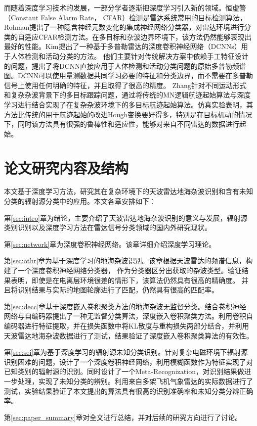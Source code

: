 而随着深度学习技术的发展，一部分学者逐渐把深度学习引入新的领域。恒虚警（Constant False Alarm Rate， CFAR）检测是雷达系统常用的目标检测算法，Rohman提出了一种隐含神经元数变化的集成神经网络分类器，对雷达环境进行分类的自适应CFAR检测方法。在多目标和杂波边界环境下，该方法仍然能够表现出最好的性能。Kim提出了一种基于多普勒雷达的深度卷积神经网络（DCNNs）用于人体检测和活动分类的方法。 他们主要针对传统解决方案中依赖手工特征设计的问题，提出了将DCNN直接应用于人体检测和活动分类问题的原始多普勒频谱图。DCNN可以使用量测数据共同学习必要的特征和分类边界，而不需要在多普勒信号上使用任何明确的特征，并且取得了很高的精度。
Zhang针对不同运动形式和复杂杂波背景下的多目标跟踪问题，通过将传统的MN逻辑航迹起始算法与深度学习进行结合实现了在复杂杂波环境下的多目标航迹起始算法。仿真实验表明，其方法比传统的用于航迹起始的改进Hough变换要好得多，特别是在目标机动的情况下，同时该方法具有很强的鲁棒性和适应性，能够对来自不同雷达的数据进行起始。


\section{论文研究内容及结构}

本文基于深度学习方法，研究其在复杂环境下的天波雷达地海杂波识别和含有未知分类的辐射源分类中的应用。本文各章安排如下：

第\ref{sec:intro}章为绪论，主要介绍了天波雷达地海杂波识别的意义与发展，辐射源类别识别以及深度学习方法在雷达信号分类领域的国内外研究现状。

第\ref{sec:network}章为深度卷积神经网络。该章详细介绍深度学习理论。

第\ref{sec:othr}章为基于深度学习的地海杂波识别。该章根据天波雷达的频谱信息，构建了一个深度卷积神经网络分类器，
作为分类器区分出获取的杂波类型。验证结果表明，即使是在电离层环境很差的情形下，该算法仍然具有很高的精确度。
并且将识别结果与实际的地图轮廓进行了匹配，仍然具有很高的匹配率。

第\ref{sec:decc}章基于深度嵌入卷积聚类方法的地海杂波无监督分类。结合卷积神经网络与自编码器提出了一种无监督分类算法，深度嵌入卷积聚类方法。利用卷积自编码器进行特征提取，并在损失函数中将KL散度与重构损失两部分结合，并利用天波雷达地海杂波数据进行了测试，结果验证了深度嵌入卷积聚类算法的有效性。

第\ref{sec:sei}章为基于深度学习的辐射源未知分类识别。针对复杂电磁环境下辐射源识别困难的问题，设计了一个深度卷积神经网络，利用模糊函数作为特征实现了对已知类别的辐射源的识别。同时设计了一个Meta-Recognization，对识别结果做进一步处理，实现了未知分类的辨别。利用来自多架飞机气象雷达的实际数据进行了测试，实验结果验证了本文提出的算法具有很高的识别准确率和未知分类分辨正确率。

第\ref{sec:paper_summary}章对全文进行总结，并对后续的研究方向进行了讨论。
